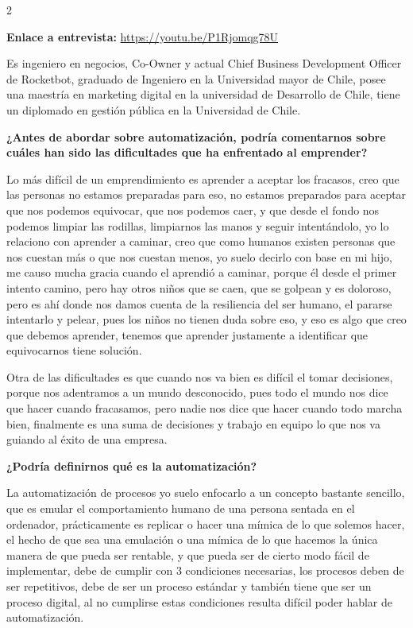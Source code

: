 \documentclass[12pt,spanish,Letterpaper,openany]{book}
\begin{document}
\begin {multicols}{2}

\textbf{Enlace a entrevista:} \url{https://youtu.be/P1Rjomqg78U}

Es ingeniero en negocios, Co-Owner y actual Chief Business Development Officer de Rocketbot, graduado de Ingeniero en la Universidad mayor de Chile, posee una maestría en marketing digital en la universidad de Desarrollo de Chile, tiene un diplomado en gestión pública en la Universidad de Chile.

\textbf{¿Antes de abordar sobre automatización, podría comentarnos sobre cuáles han sido las dificultades que ha enfrentado al emprender?}

Lo más difícil de un emprendimiento es aprender a aceptar los fracasos, creo que las personas no estamos preparadas para eso, no estamos preparados para aceptar que nos podemos equivocar, que nos podemos caer, y que desde el fondo nos podemos limpiar las rodillas, limpiarnos las manos y seguir intentándolo, yo lo relaciono con aprender a caminar, creo que como humanos existen personas que nos cuestan más o que nos cuestan menos, yo suelo decirlo con base en mi hijo, me causo mucha gracia cuando el aprendió a caminar, porque él desde el primer intento camino, pero hay otros niños que se caen, que se golpean y es doloroso, pero es ahí donde nos damos cuenta de la resiliencia del ser humano, el pararse intentarlo y pelear, pues los niños no tienen duda sobre eso, y eso es algo que creo que debemos aprender, tenemos que aprender justamente a identificar que equivocarnos tiene solución.

Otra de las dificultades es que cuando nos va bien es difícil el tomar decisiones, porque nos adentramos a un mundo desconocido, pues todo el mundo nos dice que hacer cuando fracasamos, pero nadie nos dice que hacer cuando todo marcha bien, finalmente es una suma de decisiones y trabajo en equipo lo que nos va guiando al éxito de una empresa.

\textbf{¿Podría definirnos qué es la automatización?}

La automatización de procesos yo suelo enfocarlo a un concepto bastante sencillo, que es emular el comportamiento humano de una persona sentada en el ordenador, prácticamente es replicar o hacer una mímica de lo que solemos hacer, el hecho de que sea una emulación o una mímica de lo que hacemos la única manera de que pueda ser rentable, y que pueda ser de cierto modo fácil de implementar, debe de cumplir con 3 condiciones necesarias, los procesos deben de ser repetitivos, debe de ser un proceso estándar y también tiene que ser un proceso digital, al no cumplirse estas condiciones resulta difícil poder hablar de automatización.


\end{multicols}
\end{document}
